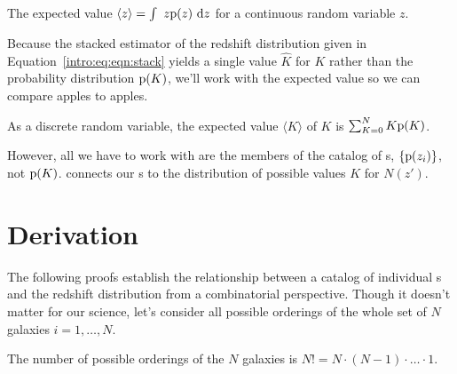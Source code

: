 

\begin{definition}\label{def:expected}
	The expected value $\langle z \rangle = \int\ z \mathrm{p}(z)\ \mathrm{d} z$ for a continuous random variable $z$.
\end{definition}

Because the stacked estimator of the redshift distribution given in Equation~\ref{intro:eq:eqn:stack} yields a single value $\hat{K}$ for $K$ rather than the probability distribution $\mathrm{p}(K)$, we'll work with the expected value so we can compare apples to apples.

\begin{lemma}\label{lem:expectednz}
	As a discrete random variable, the expected value $\langle K \rangle$ of $K$ is $\sum_{K = 0}^{N} K \mathrm{p}(K)$.
\end{lemma}

However, all we have to work with are the members of the catalog of \pzpdf s, $\{\mathrm{p}(z_{i})\}$, not $\mathrm{p}(K)$.
 connects our \pzpdf s to the distribution of possible values $K$ for $N(z')$.

\section{Derivation}

The following proofs establish the relationship between a catalog of individual \pzpdf s and the redshift distribution from a combinatorial perspective.
Though it doesn't matter for our science, let's consider all possible orderings of the whole set of $N$ galaxies $i = 1, \dots, N$.

\begin{definition}\label{def:permutations}
	The number of possible orderings of the $N$ galaxies is $N! = N \cdot (N - 1) \cdot \dots \cdot 1$.
\end{definition}

